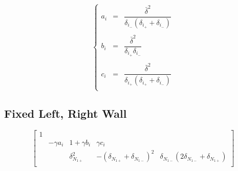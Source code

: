 \documentclass[aps,11pt]{revtex4}
\begin{document}
\begin{equation}
\left\lbrace
\begin{array}{rcc}
	a_i & = & \dfrac{\bar{\delta}^2}{\delta_{i_-}(\delta_{i_+}+\delta_{i_-})}\\
	\\
	b_i & = & \dfrac{\bar{\delta}^2}{\delta_{i_+}\delta_{i_-}}\\
	\\
	c_i & = & \dfrac{\bar{\delta}^2}{\delta_{i_+}(\delta_{i_+}+\delta_{i_-})}\\
\end{array}
\right.
\end{equation}

\subsection{Fixed Left, Right Wall}
\begin{equation}
\begin{bmatrix}
1 & \\
   & -\gamma a_i & 1+ \gamma b_i & \gamma c_i &\\
   & &  \delta_{N_{1+}}^2       &     -(\delta_{N_{1+}}+\delta_{N_{1-}})^2          & \delta_{N_{1-}}(2\delta_{N_{1-}}+\delta_{N_{1+}}) \\
\end{bmatrix}
\end{equation}
\end{document}
